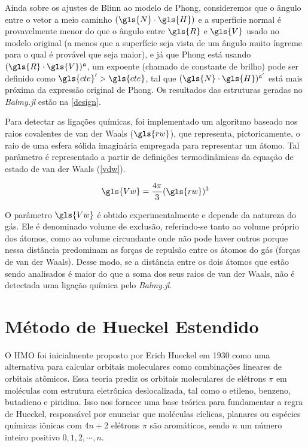 Ainda sobre os ajustes de Blinn ao modelo de Phong, consideremos que o ângulo entre o vetor a meio caminho $(\gls{N} \cdot \gls{H})$ e a superfície normal é provavelmente menor do que o ângulo entre $\gls{R}$ e $\gls{V}$ usado no modelo original (a menos que a superfície seja vista de um ângulo muito íngreme para o qual é provável que seja maior), e já que Phong está usando $(\gls{R} \cdot \gls{V})^\mathfrak{a}$, um expoente (chamado de constante de brilho) pode ser definido como $\gls{cte}' > \gls{cte}$, tal que $(\gls{N} \cdot \gls{H})^{\mathfrak{a}'}$ está mais próxima da expressão original de Phong. Os resultados das estruturas geradas no \textit{Balmy.jl} estão na \autoref{design}.

Para detectar as ligações químicas, foi implementado um algoritmo baseado nos raios covalentes de van der Waals ($\gls{rw}$), que representa, pictoricamente, o raio de uma esfera sólida imaginária empregada para representar um átomo. Tal parâmetro é representado a partir de definições termodinâmicas da equação de estado de van der Waals (\autoref{vdw})\autocite{Volodina2022}.

\begin{equation}
\label{vdw}
    \gls{Vw} = \frac{4\pi}{3}  ({\gls{rw}})^3
\end{equation}

O parâmetro $\gls{Vw}$ é obtido experimentalmente e depende da natureza do gás. Ele é denominado volume de exclusão, referindo-se tanto ao volume próprio dos átomos, como ao volume circundante onde não pode haver outros porque nessa distância predominam as forças de repulsão entre os átomos do gás (forças de van der Waals). Desse modo, se a distância entre os dois átomos que estão sendo analisados é maior do que a soma dos seus raios de van der Waals, não é detectada uma ligação química pelo \textit{Balmy.jl}.

\section{Método de Hueckel Estendido}

O \gls{HMO} foi inicialmente proposto por Erich Hueckel em 1930 \autocite{Hckel1931} como uma alternativa para calcular orbitais moleculares como combinações lineares de orbitais atômicos\autocite{Coulson1978-ot}. Essa teoria prediz os orbitais moleculares de elétrons $\pi$ em moléculas com estrutura eletrônica deslocalizada, tal como o etileno, benzeno, butadieno e piridina. Isso nos fornece uma base teórica para fundamentar a regra de Hueckel, responsável por enunciar que moléculas cíclicas, planares ou espécies químicas iônicas com $4n + 2$ elétrons $\pi$ são aromáticos, sendo $n$ um número inteiro positivo $0, 1, 2, \cdots, n$.

